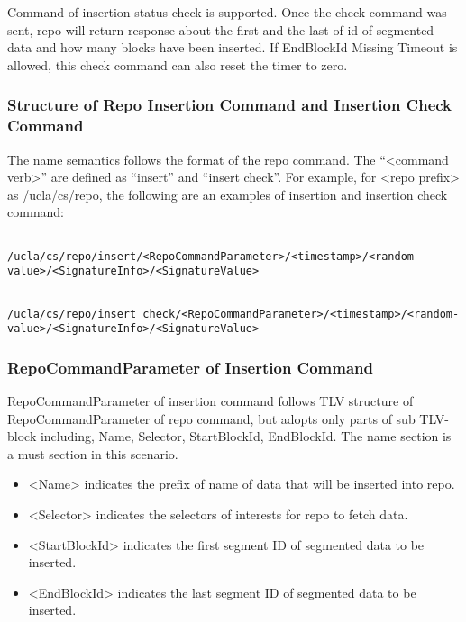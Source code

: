\documentclass{acm_proc_article-sp}
\begin{document}
Command of insertion status check is supported. Once the check command was sent, repo will return response about the first and the last of id of segmented data and how many blocks have been inserted. If EndBlockId Missing Timeout is allowed, this check command can also reset the timer to zero.

\subsubsection{Structure of Repo Insertion Command and Insertion Check Command}
The name semantics follows the format of the repo command. The ``<command verb>'' are defined as ``insert'' and ``insert check''. For example, for <repo prefix> as /ucla/cs/repo, the following are an examples of insertion and insertion check command:

\begin{figure*}
\begin{framed}
\begin{BVerbatim}

/ucla/cs/repo/insert/<RepoCommandParameter>/<timestamp>/<random-value>/<SignatureInfo>/<SignatureValue>

\end{BVerbatim}
\end{framed}
\end{figure*}

\begin{figure*}
\begin{framed}
\begin{BVerbatim}

/ucla/cs/repo/insert check/<RepoCommandParameter>/<timestamp>/<random-value>/<SignatureInfo>/<SignatureValue>

\end{BVerbatim}
\end{framed}
\end{figure*}


\subsubsection{RepoCommandParameter of Insertion Command}
RepoCommandParameter of insertion command follows TLV structure of RepoCommandParameter of repo command, but adopts only parts of sub TLV-block including, Name, Selector, StartBlockId, EndBlockId. The name section is a must section in this scenario.

\begin{itemize}
\item <Name> indicates the prefix of name of data that will be inserted into repo.
\item <Selector> indicates the selectors of interests for repo to fetch data.
\item <StartBlockId> indicates the first segment ID of segmented data to be inserted.
\item <EndBlockId> indicates the last segment ID of segmented data to be inserted.
\end{itemize}
\end{document}
